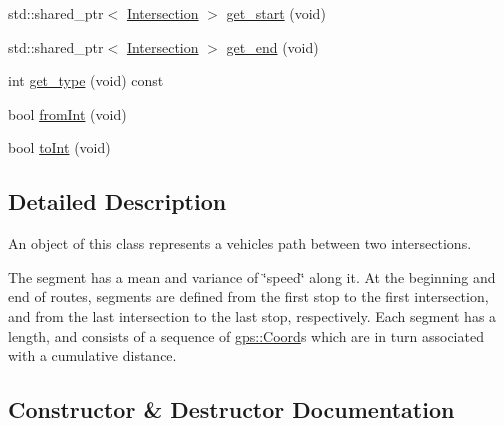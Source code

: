 \begin{DoxyCompactItemize}
\item 
std\+::shared\+\_\+ptr$<$ \hyperlink{classgtfs_1_1Intersection}{Intersection} $>$ \hyperlink{classgtfs_1_1Segment_a8f64f5b0859e79e9bdd2c0faa7e50e23}{get\+\_\+start} (void)
\item 
std\+::shared\+\_\+ptr$<$ \hyperlink{classgtfs_1_1Intersection}{Intersection} $>$ \hyperlink{classgtfs_1_1Segment_a13181832822c8780ab7c944d2fea2a66}{get\+\_\+end} (void)
\item 
int \hyperlink{classgtfs_1_1Segment_ace65bcda26860737601ab722027d19db}{get\+\_\+type} (void) const 
\item 
bool \hyperlink{classgtfs_1_1Segment_aa6d202be9bccb10ebd3c9274b7ab9e0c}{from\+Int} (void)
\item 
bool \hyperlink{classgtfs_1_1Segment_a2b289f1a504fcd1912e588525fc46a41}{to\+Int} (void)
\end{DoxyCompactItemize}


\subsection{Detailed Description}
An object of this class represents a vehicles path between two intersections.

The segment has a mean and variance of \char`\"{}speed\char`\"{} along it. At the beginning and end of routes, segments are defined from the first stop to the first intersection, and from the last intersection to the last stop, respectively. Each segment has a length, and consists of a sequence of \hyperlink{classgps_1_1Coord}{gps\+::\+Coord}\textquotesingle{}s which are in turn associated with a cumulative distance. 

\subsection{Constructor \& Destructor Documentation}
